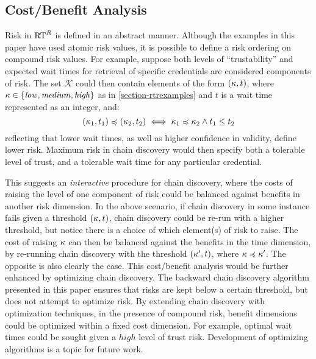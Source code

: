 \subsection{Cost/Benefit Analysis}

Risk in $\text{RT}^R$ is defined in an abstract manner.  Although the
examples in this paper have used atomic risk values, it is possible to
define a risk ordering on compound risk values.  For example, suppose
both levels of ``trustability'' and expected wait times for retrieval
of specific credentials are considered components of risk.  The set
$\mathcal{K}$ could then contain elements of the form $(\kappa,t)$,
where $\kappa \in \left\{\mathit{low,medium,high}\right\}$ as in
\autoref{section-rtrexamples} and $t$ is a wait time represented as an
integer, and:
$$
(\kappa_1,t_1) \preccurlyeq (\kappa_2,t_2) \iff \kappa_1 \preccurlyeq \kappa_2 \wedge
t_1 \le t_2
$$ 
reflecting that lower wait times, as well as higher confidence in
validity, define lower risk.  Maximum risk in chain discovery would
then specify both a tolerable level of trust, and a tolerable wait
time for any particular credential.

This suggests an \emph{interactive} procedure for chain discovery,
where the costs of raising the level of one component of risk could be
balanced against benefits in another risk dimension.  In the above
scenario, if chain discovery in some instance fails given a threshold
$(\kappa, t)$, chain discovery could be re-run with a higher threshold,
but notice there is a choice of which element(s) of risk to raise.
The cost of raising $\kappa$ can then be balanced against the benefits
in the time dimension, by re-running chain discovery with the
threshold $(\kappa',t)$, where $\kappa\preccurlyeq\kappa'$.  The opposite is also
clearly the case.  This cost/benefit analysis would be further
enhanced by optimizing chain discovery.  The backward chain discovery
algorithm presented in this paper ensures that risks are kept below a
certain threshold, but does not attempt to optimize risk.  By
extending chain discovery with optimization techniques, in the
presence of compound risk, benefit dimensions could be optimized
within a fixed cost dimension.  For example, optimal wait times could
be sought given a $\mathit{high}$ level of trust risk.  Development of
optimizing algorithms is a topic for future work.
